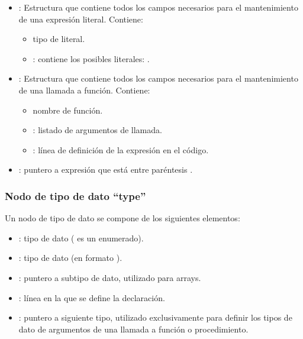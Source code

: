 \begin{itemize}
\begin{itemize}
\begin{itemize}
        \end{itemize}
    \end{itemize}
    \begin{itemize}
        \item {} : Estructura que contiene todos los campos necesarios para el mantenimiento de una expresión literal. Contiene:
        \begin{itemize}
            \item {} tipo de literal.
            \item {} : contiene los posibles literales: .
        \end{itemize}
    \end{itemize}
    \begin{itemize}
        \item {} : Estructura que contiene todos los campos necesarios para el mantenimiento de una llamada a función. Contiene:
        \begin{itemize}
            \item {} nombre de función.
            \item {} : listado de argumentos de llamada.
            \item {} : línea de definición de la expresión en el código.
        \end{itemize}
    \end{itemize}
    \begin{itemize}
        \item {} : puntero a expresión que está entre paréntesis \code{()}.
    \end{itemize}
\end{itemize}

\subsubsection{Nodo de tipo de dato ``type''}
\noindent
Un nodo de tipo de dato se compone de los siguientes elementos:
\begin{itemize}
    \item {} : tipo de dato ( es un enumerado).
    \item {} : tipo de dato (en formato ).
    \item {} : puntero a subtipo de dato, utilizado para arrays.
    \item {} : línea en la que se define la declaración.
    \item {} : puntero a siguiente tipo, utilizado exclusivamente para definir los tipos de dato de argumentos de una llamada a función o procedimiento.
\end{itemize}

